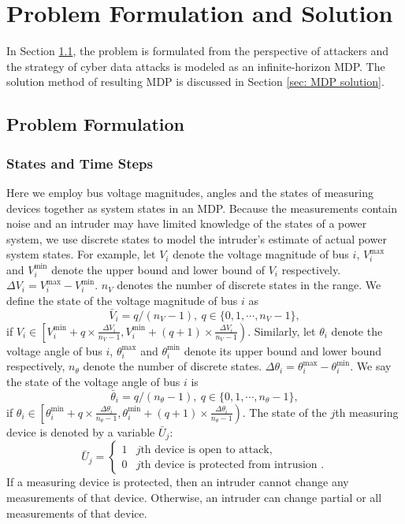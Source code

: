 \documentclass[conference,letterpaper,10pt]{IEEEtran}
\begin{document}
\section{Problem Formulation and Solution}\label{sec:method}
In Section \ref{sec: problem formulation}, the problem is formulated from the perspective of attackers and the strategy of cyber data attacks is modeled as an infinite-horizon MDP. The solution method of resulting MDP is discussed in Section \ref{sec: MDP solution}.
\subsection{Problem Formulation}\label{sec: problem formulation}
\subsubsection{States and Time Steps}	


Here we employ bus voltage magnitudes, angles and the states of measuring devices together as system states in an MDP. Because the measurements contain noise and an intruder may have limited knowledge of the states of a power system, we use discrete states to model the intruder's estimate of actual power system states. 
For example, let $V_i$ denote the voltage magnitude of bus $i$, $V_i^{\max}$ and $V_i^{\min}$ denote the upper bound and lower bound of $V_i$ respectively. $\Delta V_i=V_i^{\max}-V_i^{\min}$. $n_V$ denotes the number of discrete states in the range. We define the state of the voltage magnitude of bus $i$ as
\begin{equation}\label{equ: voltage magnitude state}
\bar{V}_i=q/(n_V-1),\ q\in \{0,1,\cdots,n_V-1\},
\end{equation}
if $V_i \in \left[V_i^{\min}+q\times \tfrac{\Delta V_i}{n_V-1},V_i^{\min}+(q+1)\times \tfrac{\Delta V_i}{n_V-1}\right)$.
Similarly, let $\theta_i$ denote the voltage angle of bus $i$, $\theta_i^{\max}$ and $\theta_i^{\min}$ denote its upper bound and lower bound respectively, $n_{\theta}$ denote the number of discrete states. $\Delta \theta_i=\theta_i^{\max}-\theta_i^{\min}$. We say the state of the voltage angle of bus $i$ is
\begin{equation}
\bar{\theta}_i=q/(n_\theta-1),\ q\in \{0,1,\cdots,n_\theta-1\},
\end{equation}
if $\theta_i \in \left[\theta_i^{\min}+q\times \tfrac{\Delta \theta_i}{n_\theta-1},\theta_i^{\min}+(q+1)\times \tfrac{\Delta \theta_i}{n_\theta-1}\right)$.
The state of the $j$th measuring device is denoted by a variable $\bar{U}_j$:
\begin{equation}
\bar{U}_j=
\begin{cases}
1 & \text{$j$th device is open to attack},\\
0 & \text{$j$th device is protected from intrusion }.		
\end{cases}
\end{equation}
If a measuring device is protected, then an intruder cannot change any measurements of that device. Otherwise, an intruder can change partial or all measurements of that device. 
\end{document}
